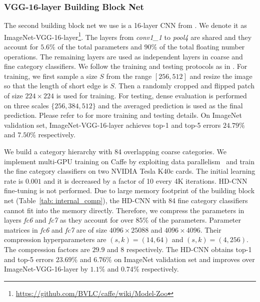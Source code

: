 \documentclass[10pt,twocolumn,letterpaper]{article}
\begin{document}
\subsubsection{VGG-16-layer Building Block Net}
The second building block net we use is a 16-layer CNN from \cite{simonyan2014very}. We denote it as ImageNet-VGG-16-layer\footnote{\url{https://github.com/BVLC/caffe/wiki/Model-Zoo}}. The layers from \textit{conv1\_1} to \textit{pool4} are shared and they account for $5.6\%$ of the total parameters and $90\%$ of the total floating number operations. The remaining layers are used as independent layers in coarse and fine category classifiers. We follow the training and testing protocols as in \cite{simonyan2014very}. For training, we first sample a size $S$ from the range $[256,512]$ and resize the image so that the length of short edge is $S$. Then a randomly cropped and flipped patch of size $224\times224$ is used for training. For testing, dense evaluation is performed on three scales $\{256,384,512\}$ and the averaged prediction is used as the final prediction. Please refer to \cite{simonyan2014very} for more training and testing details. On ImageNet validation set, ImageNet-VGG-16-layer achieves top-1 and top-5 errors $24.79\%$ and $7.50\%$ respectively.

We build a category hierarchy with 84 overlapping coarse categories. We implement multi-GPU training on Caffe by exploiting data parallelism~\cite{simonyan2014very} and train the fine category classifiers on two NVIDIA Tesla K40c cards. The initial learning rate is $0.001$ and it is decreased by a factor of 10 every 4K iterations. HD-CNN fine-tuning is not performed. Due to large memory footprint of the building block net (Table~\ref{tab: internal_comp}), the HD-CNN with 84 fine category classifiers cannot fit into the memory directly. Therefore, we compress the parameters in layers \textit{fc6} and \textit{fc7} as they account for over $85\%$ of the parameters. Parameter matrices in \textit{fc6} and \textit{fc7} are of size $4096\times 25088$ and $4096\times 4096$. Their compression hyperparameters are $(s,k)=(14,64)$ and $(s,k)=(4,256)$. The compression factors are $29.9$ and $8$ respectively.
The HD-CNN obtains top-1 and top-5 errors $23.69\%$ and $6.76\%$ on ImageNet validation set and improves over ImageNet-VGG-16-layer by $1.1\%$ and $0.74\%$ respectively.
\end{document}
